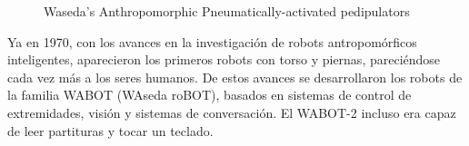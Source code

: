 \begin{figure}[H]
\quad
{}
\caption{Waseda's Anthropomorphic Pneumatically-activated pedipulators}
\label{figura210}
\end{figure}

Ya en 1970, con los avances en la investigación de robots antropomórficos inteligentes, aparecieron los primeros robots con torso y piernas, pareciéndose cada vez más a los seres humanos. De estos avances se desarrollaron los robots de la familia WABOT (WAseda roBOT), basados en sistemas de control de extremidades, visión y sistemas de conversación. El WABOT-2 incluso era capaz de leer partituras y tocar un teclado.

